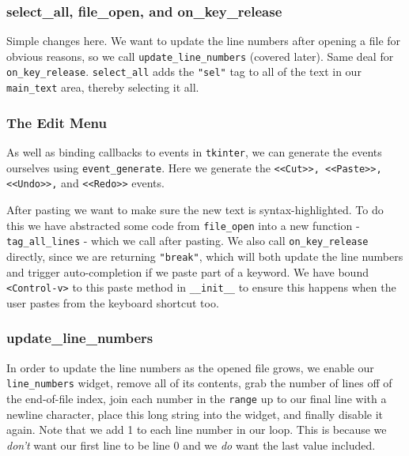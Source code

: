 \documentclass[a4paper,11pt,openany]{book}
\begin{document}
\subsubsection{select\_all, file\_open, and on\_key\_release}

Simple changes here. We want to update the line numbers after opening a file for obvious reasons, so we call \lstinline[columns=fixed]{update_line_numbers} (covered later). Same deal for \lstinline[columns=fixed]{on_key_release}. \lstinline[columns=fixed]{select_all} adds the \lstinline[columns=fixed]{"sel"} tag to all of the text in our \lstinline[columns=fixed]{main_text} area, thereby selecting it all. 

\subsubsection{The Edit Menu}

As well as binding callbacks to events in \lstinline[columns=fixed]{tkinter}, we can generate the events ourselves using \lstinline[columns=fixed]{event_generate}. Here we generate the \lstinline[columns=fixed]{<<Cut>>, <<Paste>>, <<Undo>>,} and \lstinline[columns=fixed]{<<Redo>>} events. 

\vspace{5mm}

After pasting we want to make sure the new text is syntax-highlighted. To do this we have abstracted some code from \lstinline[columns=fixed]{file_open} into a new function - \lstinline[columns=fixed]{tag_all_lines} - which we call after pasting. We also call \lstinline[columns=fixed]{on_key_release} directly, since we are returning \lstinline[columns=fixed]{"break"}, which will both update the line numbers and trigger auto-completion if we paste part of a keyword. We have bound \lstinline[columns=fixed]{<Control-v>} to this paste method in \lstinline[columns=fixed]{__init__} to ensure this happens when the user pastes from the keyboard shortcut too. 

\subsubsection{update\_line\_numbers}

In order to update the line numbers as the opened file grows, we enable our \lstinline[columns=fixed]{line_numbers} widget, remove all of its contents, grab the number of lines off of the end-of-file index, join each number in the \lstinline[columns=fixed]{range} up to our final line with a newline character, place this long string into the widget, and finally disable it again. Note that we add 1 to each line number in our loop. This is because we \textit{don't} want our first line to be line 0 and we \textit{do} want the last value included.
\end{document}

